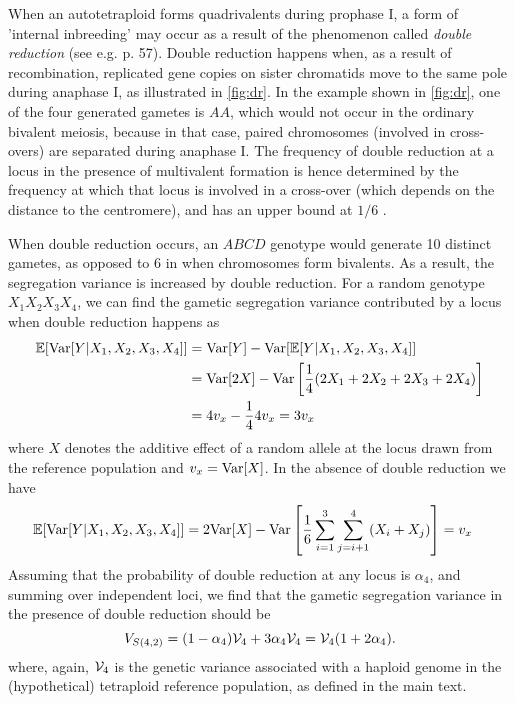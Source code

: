 \documentclass[11pt,a4paper]{article}
\begin{document}
When an autotetraploid forms quadrivalents during prophase I, a form of
'internal inbreeding' may occur as a result of the phenomenon called
\textit{double reduction} (see e.g. \cite{lynch1998} p. 57).
Double reduction happens when, as a result of recombination, replicated gene
copies on sister chromatids move to the same pole during anaphase I, as
illustrated in \cref{fig:dr}.
In the example shown in \cref{fig:dr}, one of the four generated gametes is $AA$,
which would not occur in the ordinary bivalent meiosis, because in that case,
paired chromosomes (involved in cross-overs) are separated during anaphase I.
The frequency of double reduction at a locus in the presence of multivalent
formation is hence determined by the frequency at which that locus is involved
in a cross-over (which depends on the distance to the centromere), and has an
upper bound at $1/6$ \citep{stift2008}.

When double reduction occurs, an $ABCD$ genotype would generate 10 distinct
gametes, as opposed to 6 in when chromosomes form bivalents. As a result, the
segregation variance is increased by double reduction.
For a random genotype $X_1X_2X_3X_4$, we can find the gametic segregation
variance contributed by a locus when double reduction happens as
\begin{align*}
    \mathbb{E}[\mathrm{Var}[Y|X_1,X_2,X_3,X_4]] &= \mathrm{Var}[Y] - \mathrm{Var}[\mathbb{E}[Y|X_1,X_2,X_3,X_4]] \\
        &= \mathrm{Var}[2X] - \mathrm{Var}\left[\frac1 4 (2X_1 + 2X_2 + 2X_3 + 2X_4)\right] \\
        &= 4v_x - \frac{1}{4}4v_x 
        = 3v_x
\end{align*}
where $X$ denotes the additive effect of a random allele at the locus drawn from the reference
population and $v_x = \mathrm{Var}[X]$.
In the absence of double reduction we have
\begin{align*}
    \mathbb{E}[\mathrm{Var}[Y|X_1,X_2,X_3,X_4]] 
        &= 2\mathrm{Var}[X] - \mathrm{Var}\left[\frac1 6 \sum_{i=1}^3 \sum_{j=i+1}^4(X_i+X_j)\right]
        = v_x
\end{align*}
Assuming that the probability of double reduction at any locus is $\alpha_4$,
and summing over independent loci, we find that the gametic segregation
variance in the presence of double reduction should be
\begin{equation}
V_{S(4,2)} = (1-\alpha_4)\mathcal{V}_{4} + 3\alpha_4 \mathcal{V}_{4} = \mathcal{V}_{4}(1+2\alpha_4).
\label{eq:dr}
\end{equation}
where, again, $\mathcal{V}_{4}$ is the genetic variance associated with a haploid
genome in the (hypothetical) tetraploid reference population, as defined in the
main text.
\end{document}
